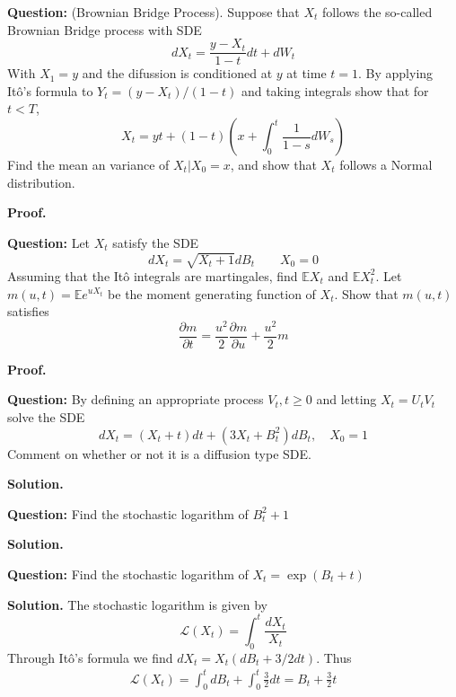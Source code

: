 \documentclass{article}
\begin{document}
\begin{tcolorbox}[colframe=black,colback=gray!5,boxrule=0.5pt]
\textbf{Question:} (Brownian Bridge Process). Suppose that $X_t$ follows the so-called Brownian Bridge process with SDE
$$dX_t = \frac{y-X_t}{1-t}dt + dW_t$$
With $X_1=y$ and the difussion is conditioned at $y$ at time $t=1$.
By applying Itô's formula to $Y_t = (y-X_t)/(1-t)$ and taking integrals show that for $t<T$,
$$X_t = yt + (1-t)\left(x+\int_0^t\frac{1}{1-s}dW_s\right)$$
Find the mean an variance of $X_t| X_0=x$, and show that $X_t$ follows a Normal distribution.
\end{tcolorbox}
\textbf{Proof.}


\begin{tcolorbox}[colframe=black,colback=gray!5,boxrule=0.5pt]
\textbf{Question:} Let $X_t$ satisfy the SDE 
$$dX_t = \sqrt{X_t+1}dB_t \quad\quad X_0=0$$
Assuming that the Itô integrals are martingales, find $\mathbb{E}X_t$ and $\mathbb{E}X_t^2$. Let $m(u,t)=\mathbb{E}e^{uX_t}$ be the moment generating function of $X_t$. Show that $m(u,t)$ satisfies
$$\frac{\partial m}{\partial t} = \frac{u^2}{2}\frac{\partial m}{\partial u} + \frac{u^2}{2}m$$
\end{tcolorbox}
\textbf{Proof.}



\begin{tcolorbox}[colframe=black,colback=gray!5,boxrule=0.5pt]
\textbf{Question:} By defining an appropriate process $V_t, t\geq0$ and letting $X_t = U_tV_t$ solve the SDE
$$dX_t = (X_t+t)dt + (3X_t+B_t^2)dB_t, \quad X_0=1$$
Comment on whether or not it is a diffusion type SDE. 
\end{tcolorbox}
\textbf{Solution.}

\begin{tcolorbox}[colframe=black,colback=gray!5,boxrule=0.5pt]
\textbf{Question:} Find the stochastic logarithm of $B_t^2+1$
\end{tcolorbox}
\textbf{Solution.}

\begin{tcolorbox}[colframe=black,colback=gray!5,boxrule=0.5pt]
\textbf{Question:} Find the stochastic logarithm of $X_t = \exp(B_t + t)$
\end{tcolorbox}
\textbf{Solution.} The stochastic logarithm is given by 
$$\mathcal{L}(X_t) = \int_0^t \frac{dX_t}{X_t}$$
Through Itô's formula we find $dX_t = X_t(dB_t + 3/2dt)$. Thus 
\begin{align*}
    \mathcal{L}(X_t) = \int_0^tdB_t + \int_0^t\frac{3}{2}dt = B_t + \frac{3}{2}t
\end{align*}
\end{document}
